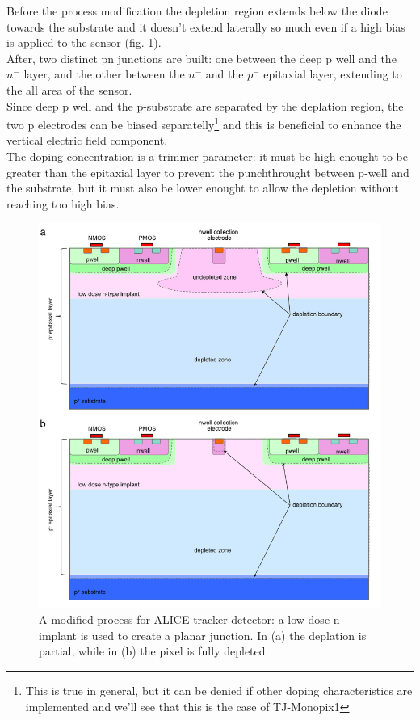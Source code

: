       Before the process modification the depletion region extends below the diode towards the substrate and it doesn't extend laterally so much even if a high bias is applied to the sensor (fig. \ref{fig:modified_process}). \\
      After, two distinct pn junctions are built: one between the deep p well and the $n^-$ layer, and the other between the $n^-$ and the $p^-$ epitaxial layer, extending to the all area of the sensor.\\ 
      Since deep p well and the p-substrate are separated by the deplation region, the two p electrodes can be biased separatelly\footnote{This is true in general, but it can be denied if other doping characteristics are implemented and we'll see that this is the case of TJ-Monopix1} and this is beneficial to enhance the vertical electric field component.\\
      The doping concentration is a trimmer parameter: it must be high enought to be greater than the epitaxial layer to prevent the punchthrought between p-well and the substrate, but it must also be lower enought to allow the depletion without reaching too high bias.
      \begin{figure}
         \centering
         \includegraphics[width=.7\linewidth]{figures/Pixel_detectors/modified_process.png}
         \caption{A modified process for ALICE tracker detector: a low dose n implant is used to create a planar junction. In (a) the deplation is partial, while in (b) the pixel is fully depleted.}
         \label{fig:modified_process}
      \end{figure}

